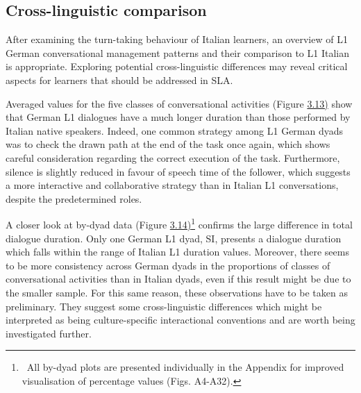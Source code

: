 \subsection[Cross{}-linguistic comparison]{Cross-linguistic comparison}
\hypertarget{Toc191305939}{}\begin{styleStandard}
After examining the turn-taking behaviour of Italian learners, an overview of L1 German conversational management patterns and their comparison to L1 Italian is appropriate. Exploring potential cross-linguistic differences may reveal critical aspects for learners that should be addressed in SLA.
\end{styleStandard}

\begin{styleStandard}
Averaged values for the five classes of conversational activities (Figure \hyperlink{bookmark158}{3.13)} show that German L1 dialogues have a much longer duration than those performed by Italian native speakers. Indeed, one common strategy among L1 German dyads was to check the drawn path at the end of the task once again, which shows careful consideration regarding the correct execution of the task. Furthermore, silence is slightly reduced in favour of speech time of the follower, which suggests a more interactive and collaborative strategy than in Italian L1 conversations, despite the predetermined roles.
\end{styleStandard}

\begin{styleStandard}
A closer look at by-dyad data (Figure \hyperlink{bookmark159}{3.14)}\footnote{\ All by-dyad plots are presented individually in the Appendix for improved visualisation of percentage values (Figs. A4-A32).} confirms the large difference in total dialogue duration. Only one German L1 dyad, SI, presents a dialogue duration which falls within the range of Italian L1 duration values. Moreover, there seems to be more consistency across German dyads in the proportions of classes of conversational activities than in Italian dyads, even if this result might be due to the smaller sample. For this same reason, these observations have to be taken as preliminary. They suggest some cross-linguistic differences which might be interpreted as being culture-specific interactional conventions and are worth being investigated further.
\end{styleStandard}

\begin{styleStandard}
  [Warning: Image ignored] %
 
\end{styleStandard}

